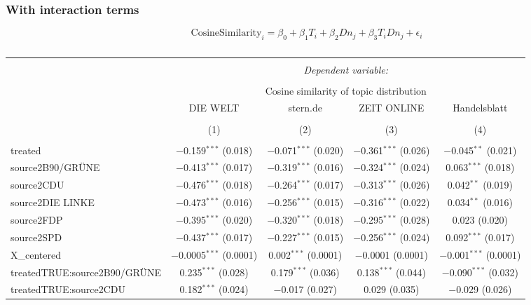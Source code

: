\documentclass[
]{article}
\begin{document}
\hypertarget{with-interaction-terms}{%
\subsubsection{With interaction terms}\label{with-interaction-terms}}

\[
\text{CosineSimilarity}_{i}=\beta_0+\beta_1T_i+\beta_2Dn_{j}+\beta_3T_iDn_{j}+\epsilon_i
\]

\begin{table}[!htbp] \centering 
  \caption{} 
  \label{} 
\tiny 
\begin{tabular}{@{\extracolsep{5pt}}lcccc} 
\\[-1.8ex]\hline 
\hline \\[-1.8ex] 
 & \multicolumn{4}{c}{\textit{Dependent variable:}} \\ 
\cline{2-5} 
\\[-1.8ex] & \multicolumn{4}{c}{Cosine similarity of topic distribution} \\ 
 & DIE WELT & stern.de & ZEIT ONLINE & Handelsblatt \\ 
\\[-1.8ex] & (1) & (2) & (3) & (4)\\ 
\hline \\[-1.8ex] 
 treated & $-$0.159$^{***}$ (0.018) & $-$0.071$^{***}$ (0.020) & $-$0.361$^{***}$ (0.026) & $-$0.045$^{**}$ (0.021) \\ 
  source2B90/GRÜNE & $-$0.413$^{***}$ (0.017) & $-$0.319$^{***}$ (0.016) & $-$0.324$^{***}$ (0.024) & 0.063$^{***}$ (0.018) \\ 
  source2CDU & $-$0.476$^{***}$ (0.018) & $-$0.264$^{***}$ (0.017) & $-$0.313$^{***}$ (0.026) & 0.042$^{**}$ (0.019) \\ 
  source2DIE LINKE & $-$0.473$^{***}$ (0.016) & $-$0.256$^{***}$ (0.015) & $-$0.316$^{***}$ (0.022) & 0.034$^{**}$ (0.016) \\ 
  source2FDP & $-$0.395$^{***}$ (0.020) & $-$0.320$^{***}$ (0.018) & $-$0.295$^{***}$ (0.028) & 0.023 (0.020) \\ 
  source2SPD & $-$0.437$^{***}$ (0.017) & $-$0.227$^{***}$ (0.015) & $-$0.256$^{***}$ (0.024) & 0.092$^{***}$ (0.017) \\ 
  X\_centered & $-$0.0005$^{***}$ (0.0001) & 0.002$^{***}$ (0.0001) & $-$0.0001 (0.0001) & $-$0.001$^{***}$ (0.0001) \\ 
  treatedTRUE:source2B90/GRÜNE & 0.235$^{***}$ (0.028) & 0.179$^{***}$ (0.036) & 0.138$^{***}$ (0.044) & $-$0.090$^{***}$ (0.032) \\ 
  treatedTRUE:source2CDU & 0.182$^{***}$ (0.024) & $-$0.017 (0.027) & 0.029 (0.035) & $-$0.029 (0.026) \\ 

\end{tabular}
\end{table}
\end{document}
